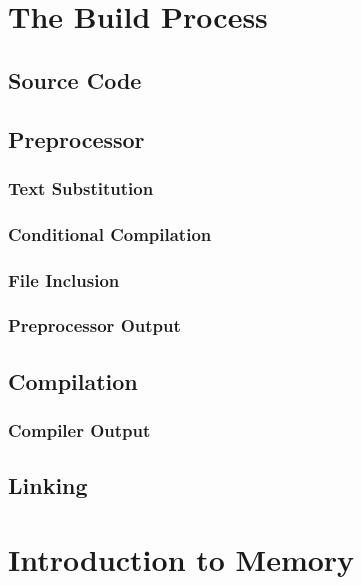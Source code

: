 \documentclass{article}
\title{\thistitle}
\author{\me}
\date{\today}
\begin{document}
\maketitle
\tableofcontents
\pagebreak

\section{The Build Process}

\subsection{Source Code}

\subsection{Preprocessor}

\subsubsection{Text Substitution}

\subsubsection{Conditional Compilation}

\subsubsection{File Inclusion}

\subsubsection{Preprocessor Output}

\subsection{Compilation}

\subsubsection{Compiler Output}

\subsection{Linking}

\section{Introduction to Memory}
\end{document}
